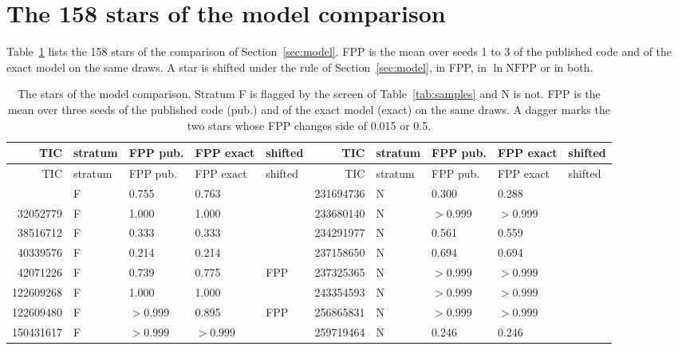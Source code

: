 \documentclass[11pt]{article}
\begin{document}
\appendix
\section{The 158 stars of the model comparison}\label{sec:stars}

Table~\ref{tab:stars} lists the 158 stars of the comparison of Section~\ref{sec:model}. FPP is the mean over seeds 1 to 3 of the published code and of the exact model on the same draws. A star is shifted under the rule of Section~\ref{sec:model}, in FPP, in $\ln\mathrm{NFPP}$ or in both.

\begin{center}
\scriptsize
\setlength{\tabcolsep}{3.5pt}\setlength{\LTcapwidth}{\textwidth}
\begin{longtable}{rllll@{\hspace{2.5em}}rllll}
\caption{The stars of the model comparison. Stratum F is flagged by the screen of Table~\ref{tab:samples} and N is not. FPP is the mean over three seeds of the published code (pub.) and of the exact model (exact) on the same draws. A dagger marks the two stars whose FPP changes side of 0.015 or 0.5.}\label{tab:stars}\\
\toprule
TIC & stratum & FPP pub. & FPP exact & shifted & TIC & stratum & FPP pub. & FPP exact & shifted \\
\midrule
\endfirsthead
\toprule
TIC & stratum & FPP pub. & FPP exact & shifted & TIC & stratum & FPP pub. & FPP exact & shifted \\
\midrule
\endhead
\bottomrule
\endfoot
26584326 & F & 0.755 & 0.763 &  & 231694736 & N & 0.300 & 0.288 &  \\
32052779 & F & 1.000 & 1.000 &  & 233680140 & N & $>0.999$ & $>0.999$ &  \\
38516712 & F & 0.333 & 0.333 &  & 234291977 & N & 0.561 & 0.559 &  \\
40339576 & F & 0.214 & 0.214 &  & 237158650 & N & 0.694 & 0.694 &  \\
42071226 & F & 0.739 & 0.775 & FPP & 237325365 & N & $>0.999$ & $>0.999$ &  \\
122609268 & F & 1.000 & 1.000 &  & 243354593 & N & $>0.999$ & $>0.999$ &  \\
122609480 & F & $>0.999$ & 0.895 & FPP & 256865831 & N & $>0.999$ & $>0.999$ &  \\
150431617 & F & $>0.999$ & $>0.999$ &  & 259719464 & N & 0.246 & 0.246 &  \\

\end{longtable}
\end{center}
\end{document}

